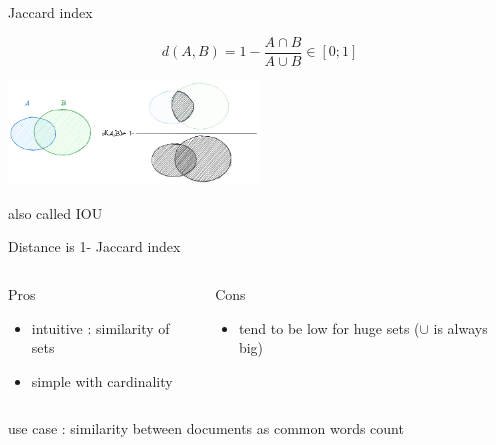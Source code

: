 \documentclass{beamer}
\begin{document}
\begin{frame}{Jaccard index}

$$d(A,B)= 1-\frac{A \cap B}{A \cup B} \in [0;1]$$

\begin{center}
\includegraphics[width=0.5\textwidth,keepaspectratio]{img/jaccard.png}
\end{center}


also called \alert{IOU}

Distance is 1- Jaccard index



\begin{scriptsize}
\begin{columns}[T,onlytextwidth]
\begin{block}{Pros}
\begin{itemize}
  \item intuitive : similarity of sets
  \item simple with cardinality
\end{itemize}
\end{block}
\begin{block}{Cons}
\begin{spacing}{0.9}
\begin{itemize}
  \item tend to be low for huge sets ($\cup$ is always big)
\end{itemize}
\end{spacing}
\end{block}
\end{columns}
\end{scriptsize}


use case : similarity between documents as common words count

\end{frame}
\end{document}
